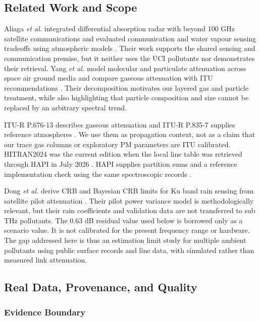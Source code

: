 \documentclass[conference]{IEEEtran}
\begin{document}
\subsection{Related Work and Scope}

Aliaga \emph{et al.} integrated differential absorption radar with beyond 100 GHz satellite communications and evaluated communication and water vapour sensing tradeoffs using atmospheric models \cite{aliaga2024dar}. Their work supports the shared sensing and communication premise, but it neither uses the UCI pollutants nor demonstrates their retrieval. Yang \emph{et al.} model molecular and particulate attenuation across space air ground media and compare gaseous attenuation with ITU recommendations \cite{yang2024attenuation}. Their decomposition motivates our layered gas and particle treatment, while also highlighting that particle composition and size cannot be replaced by an arbitrary spectral trend.

ITU-R P.676-13 describes gaseous attenuation and ITU-R P.835-7 supplies reference atmospheres \cite{itu676,itu835}. We use them as propagation context, not as a claim that our trace gas columns or exploratory PM parameters are ITU calibrated. HITRAN2024 was the current edition when the local line table was retrieved through HAPI in July 2026 \cite{gordon2026hitran}. HAPI supplies partition sums and a reference implementation check using the same spectroscopic records \cite{kochanov2016hapi}.

Dong \emph{et al.} derive CRB and Bayesian CRB limits for Ku band rain sensing from satellite pilot attenuation \cite{dong2026rain}. Their pilot power variance model is methodologically relevant, but their rain coefficients and validation data are not transferred to sub THz pollutants. The 0.63 dB residual value used below is borrowed only as a scenario value. It is not calibrated for the present frequency range or hardware. The gap addressed here is thus an estimation limit study for multiple ambient pollutants using public surface records and line data, with simulated rather than measured link attenuation.

\subsection{Real Data, Provenance, and Quality}

\subsubsection{Evidence Boundary}
\end{document}
